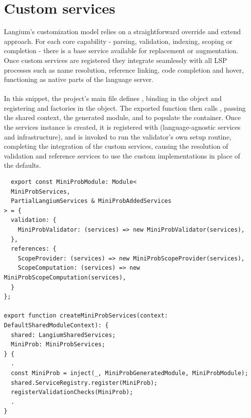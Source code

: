 \section{Custom services}
\label{sec:customservices}

Langium's customization model relies on a straightforward override and extend approach. For each core capability - parsing, validation, indexing, scoping or completion
- there is a base service available for replacement or augmentation. Once custom services are registered they integrate seamlessly with all LSP processes such as name
resolution, reference linking, code completion and hover, functioning as native parts of the language server.
\\\\
In this snippet, the project's main  file defines , binding  in the  object and registering
 and  factories in the  object. The exported  function then calls ,
passing the shared context, the generated module, and  to populate the  container. Once the  services instance is created,
it is registered with  (language-agnostic services and infrastructure), and  is invoked to run the validator's own setup routine, completing the integration of the custom services,
causing the resolution of validation and reference services to use the custom implementations in place of the defaults.

\begin{verbatim}
  export const MiniProbModule: Module<
  MiniProbServices,
  PartialLangiumServices & MiniProbAddedServices
> = {
  validation: {
    MiniProbValidator: (services) => new MiniProbValidator(services),
  },
  references: {
    ScopeProvider: (services) => new MiniProbScopeProvider(services),
    ScopeComputation: (services) => new MiniProbScopeComputation(services),
  }
};

export function createMiniProbServices(context: DefaultSharedModuleContext): {
  shared: LangiumSharedServices;
  MiniProb: MiniProbServices;
} {
  .
  const MiniProb = inject(_, MiniProbGeneratedModule, MiniProbModule);
  shared.ServiceRegistry.register(MiniProb);
  registerValidationChecks(MiniProb);
  .
}
\end{verbatim}


